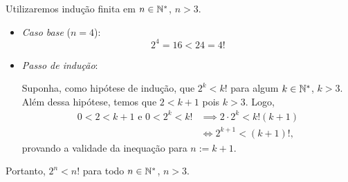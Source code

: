 \begin{solution}
Utilizaremos indução finita em $n \in \mathbb{N}^*$, $n >3$.
%
\begin{itemize}
	\item \textit{Caso base} ($n=4$):
	\begin{equation*}
	2^4 =16 < 24=4!
	\end{equation*}  
	\item \textit{Passo de indução}:

	Suponha, como hipótese de indução, que $2^k < k!$ para algum $k \in \mathbb{N}^*$, $k>3$. Além dessa hipótese, temos que $2 < k+1$ pois $k>3$. Logo,
	\begin{align*}
	0<2<k+1 \text{ e } 0<2^k<k! & \implies 2\cdot 2^k < k!(k+1) \\
	& \iff 2^{k+1} < (k+1)!,
	\end{align*}
	provando a validade da inequação para $n:=k+1$.
\end{itemize}
%
Portanto, $2^n < n!$ para todo $n \in \mathbb{N}^*$, $n>3$.
\end{solution}